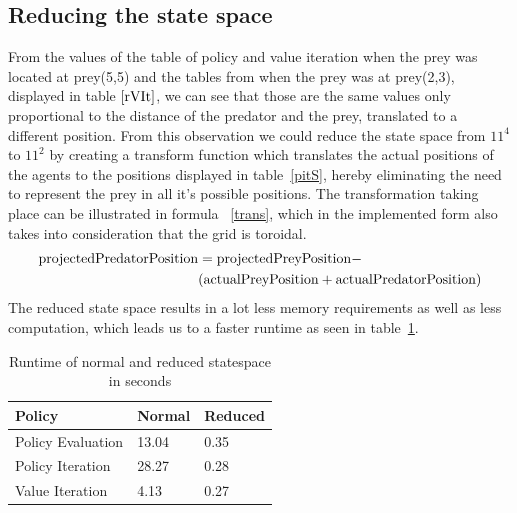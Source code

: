 \documentclass[paper=a4, fontsize=11pt]{scrartcl}
\numberwithin{equation}{section}		%
\numberwithin{figure}{section}			%
\numberwithin{table}{section}				%
\begin{document}
\subsection{Reducing the state space}
\label{reduce}
From the values of the table of policy and value iteration when the prey was located at prey(5,5) and the tables from when the prey was at prey(2,3), displayed in table $\ref{rVIt}$, we can see that those are the same values only proportional to the distance of the predator and the prey, translated to a different position. From this observation we could reduce the state space from $11^4$  to $11^2$ by creating a transform function which translates the actual positions of the agents to the positions displayed in table~\ref{pitS}, hereby eliminating the need to represent the prey in all it's possible positions. The transformation taking place can be illustrated in formula ~\ref{trans}, which in the implemented form also takes into consideration that the grid is toroidal.
\begin{align}
\text{projectedPredatorPosition} & = \text{projectedPreyPosition} - \notag\\
&(\text{actualPreyPosition} + \text{actualPredatorPosition})\label{trans}
\end{align}
The reduced state space results in a lot less memory requirements as well as less computation, which leads us to a faster runtime as seen in table~\ref{runtime}. 

\begin{table}[H]
\caption{Runtime of normal and reduced statespace in seconds}
\centering
    \begin{tabular}{|l || l || l |}
    \hline
    Policy & Normal & Reduced \\ \hline
    Policy Evaluation & 13.04 & 0.35\\ \hline
    Policy Iteration & 28.27 & 0.28 \\ \hline
    Value Iteration & 4.13 & 0.27 \\
    \hline
    \end{tabular}
    \label{runtime}
\end{table}
\end{document}
